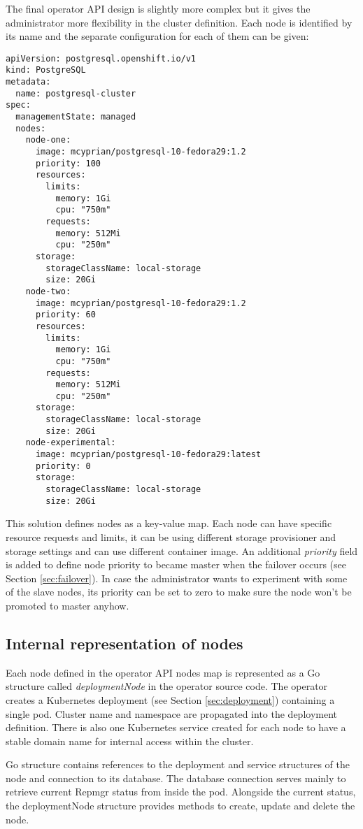 \documentclass[
  digital, %
  twoside, %
  table,   %
  nolof,   %
  nolot,   %
]{fithesis3}
\begin{document}
The final operator API design is slightly more complex but it gives the administrator more flexibility in the cluster definition. Each node is identified by its name and the separate configuration for each of them can be given:

\begin{lstlisting}
apiVersion: postgresql.openshift.io/v1
kind: PostgreSQL
metadata:
  name: postgresql-cluster
spec:
  managementState: managed
  nodes:
    node-one:
      image: mcyprian/postgresql-10-fedora29:1.2
      priority: 100
      resources:
        limits:
          memory: 1Gi
          cpu: "750m"
        requests:
          memory: 512Mi
          cpu: "250m"
      storage:
        storageClassName: local-storage
        size: 20Gi
    node-two:
      image: mcyprian/postgresql-10-fedora29:1.2
      priority: 60
      resources:
        limits:
          memory: 1Gi
          cpu: "750m"
        requests:
          memory: 512Mi
          cpu: "250m"
      storage:
        storageClassName: local-storage
        size: 20Gi
    node-experimental:
      image: mcyprian/postgresql-10-fedora29:latest
      priority: 0
      storage:
        storageClassName: local-storage
        size: 20Gi
\end{lstlisting}

This solution defines nodes as a key-value map. Each node can have specific resource requests and limits, it can be using different storage provisioner and storage settings and can use different container image. An additional \textit{priority} field is added to define node priority to became master when the failover occurs (see Section \ref{sec:failover}). In case the administrator wants to experiment with some of the slave nodes, its priority can be set to zero to make sure the node won't be promoted to master anyhow.

\subsection{Internal representation of nodes}
 Each node defined in the operator API nodes map is represented as a Go structure called \textit{deploymentNode} in the operator source code. The operator creates a Kubernetes deployment (see Section \ref{sec:deployment}) containing a single pod. Cluster name and namespace are propagated into the deployment definition. There is also one Kubernetes service created for each node to have a stable domain name for internal access within the cluster.

 Go structure contains references to the deployment and service structures of the node and connection to its database. The database connection serves mainly to retrieve current Repmgr status from inside the pod. Alongside the current status, the deploymentNode structure provides methods to create, update and delete the node.
\end{document}
